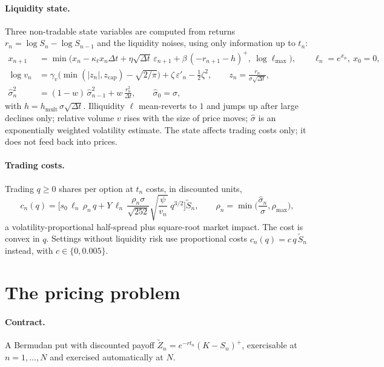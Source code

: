 \documentclass[11pt]{article}
\theoremstyle{definition}
\theoremstyle{remark}
\newcommand{\St}{\tilde S}
\newcommand{\Zt}{\tilde Z}
\begin{document}
\paragraph{Liquidity state.}
Three non-tradable state variables are computed from returns $r_n=\log S_n-\log S_{n-1}$ and the liquidity
noises, using only information up to $t_n$:
\begin{align}
x_{n+1}&=\min\!\Big(x_n-\kappa_\ell x_n\Delta t+\eta\sqrt{\Delta t}\,\varepsilon_{n+1}
+\beta\,(-r_{n+1}-h)^+,\ \log\ell_{\max}\Big),\qquad \ell_n=e^{x_n},\ x_0=0,\label{eq:illiq}\\
\log v_n&=\gamma_v\Big(\min(|z_n|,z_{\mathrm{cap}})-\sqrt{2/\pi}\Big)+\zeta\,\varepsilon'_n-\tfrac12\zeta^2,
\qquad z_n=\frac{r_n}{\sigma\sqrt{\Delta t}},\label{eq:volume}\\
\hat\sigma_n^2&=(1-w)\,\hat\sigma_{n-1}^2+w\,\frac{r_n^2}{\Delta t},\qquad \hat\sigma_0=\sigma,\label{eq:ewma}
\end{align}
with $h=h_{\mathrm{mult}}\,\sigma\sqrt{\Delta t}$. Illiquidity $\ell$ mean-reverts to $1$ and jumps up after
large declines only; relative volume $v$ rises with the size of price moves; $\hat\sigma$ is an
exponentially weighted volatility estimate. The state affects trading costs only; it does not feed back
into prices.

\paragraph{Trading costs.}
Trading $q\ge 0$ shares per option at $t_n$ costs, in discounted units,
\begin{equation}\label{eq:cost}
c_n(q)=\Big[s_0\,\ell_n\,\rho_n\,q+Y\,\ell_n\,\frac{\rho_n\sigma}{\sqrt{252}}\sqrt{\frac{\psi}{v_n}}\;q^{3/2}\Big]\St_n,
\qquad \rho_n=\min\!\Big(\frac{\hat\sigma_n}{\sigma},\rho_{\max}\Big),
\end{equation}
a volatility-proportional half-spread plus square-root market impact. The cost is convex in $q$.
Settings without liquidity risk use proportional costs $c_n(q)=c\,q\,\St_n$ instead, with $c\in\{0,0.005\}$.

\section{The pricing problem}

\paragraph{Contract.} A Bermudan put with discounted payoff $\Zt_n=e^{-rt_n}(K-S_n)^+$, exercisable at
$n=1,\dots,N$ and exercised automatically at $N$.
\end{document}

